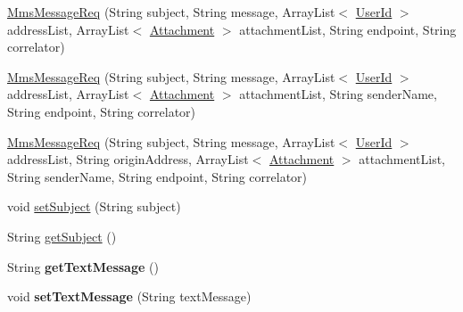 \begin{DoxyCompactItemize}
\item 
\hyperlink{classcom_1_1bluevia_1_1messagery_1_1mt_1_1mms_1_1data_1_1MmsMessageReq_ada74e0bfc37a563d74ffb31abd878c66}{MmsMessageReq} (String subject, String message, ArrayList$<$ \hyperlink{classcom_1_1bluevia_1_1commons_1_1data_1_1UserId}{UserId} $>$ addressList, ArrayList$<$ \hyperlink{classcom_1_1bluevia_1_1messagery_1_1mt_1_1mms_1_1data_1_1Attachment}{Attachment} $>$ attachmentList, String endpoint, String correlator)
\item 
\hyperlink{classcom_1_1bluevia_1_1messagery_1_1mt_1_1mms_1_1data_1_1MmsMessageReq_ad8519c8fda0da62f5f32106f64e7a23d}{MmsMessageReq} (String subject, String message, ArrayList$<$ \hyperlink{classcom_1_1bluevia_1_1commons_1_1data_1_1UserId}{UserId} $>$ addressList, ArrayList$<$ \hyperlink{classcom_1_1bluevia_1_1messagery_1_1mt_1_1mms_1_1data_1_1Attachment}{Attachment} $>$ attachmentList, String senderName, String endpoint, String correlator)
\item 
\hyperlink{classcom_1_1bluevia_1_1messagery_1_1mt_1_1mms_1_1data_1_1MmsMessageReq_a74b0d8cce8ca6026617bf4eff39de6e6}{MmsMessageReq} (String subject, String message, ArrayList$<$ \hyperlink{classcom_1_1bluevia_1_1commons_1_1data_1_1UserId}{UserId} $>$ addressList, String originAddress, ArrayList$<$ \hyperlink{classcom_1_1bluevia_1_1messagery_1_1mt_1_1mms_1_1data_1_1Attachment}{Attachment} $>$ attachmentList, String senderName, String endpoint, String correlator)
\item 
void \hyperlink{classcom_1_1bluevia_1_1messagery_1_1mt_1_1mms_1_1data_1_1MmsMessageReq_a9968b950f95d514cc8172256756864ba}{setSubject} (String subject)
\item 
String \hyperlink{classcom_1_1bluevia_1_1messagery_1_1mt_1_1mms_1_1data_1_1MmsMessageReq_af3923a45441ea8db8a89a81f7723508a}{getSubject} ()
\item 
\hypertarget{classcom_1_1bluevia_1_1messagery_1_1mt_1_1mms_1_1data_1_1MmsMessageReq_a898fb2f94caba5f39329cff0fde2d359}{
String {\bfseries getTextMessage} ()}
\label{classcom_1_1bluevia_1_1messagery_1_1mt_1_1mms_1_1data_1_1MmsMessageReq_a898fb2f94caba5f39329cff0fde2d359}

\item 
\hypertarget{classcom_1_1bluevia_1_1messagery_1_1mt_1_1mms_1_1data_1_1MmsMessageReq_ab83b865e1e052e35236730e408943ec1}{
void {\bfseries setTextMessage} (String textMessage)}
\label{classcom_1_1bluevia_1_1messagery_1_1mt_1_1mms_1_1data_1_1MmsMessageReq_ab83b865e1e052e35236730e408943ec1}


\end{DoxyCompactItemize}
